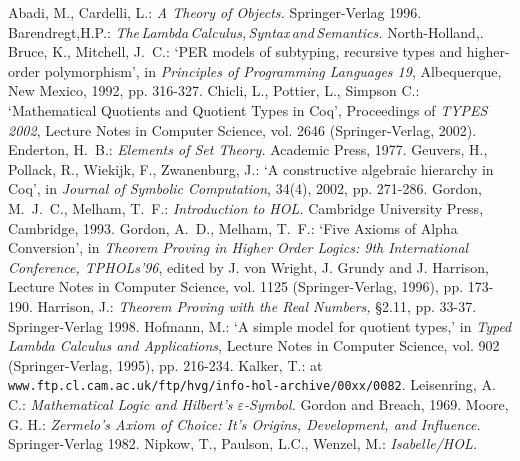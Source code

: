 \documentclass[envcountsame,runningheads]{llncs}
\begin{document}
%
%
\begin{thebibliography}{5}
%
Abadi, M., Cardelli, L.:
{\it A Theory of Objects.}
Springer-Verlag 1996.
%
Barendregt,\:H.P.:
{\it The\,Lambda\,Calculus,\,Syntax\,and\,Semantics.}
North-Holland,.
%
Bruce, K., Mitchell, J.~C.:
`PER models of subtyping, recursive types and higher-order polymorphism', in
{\it Principles of Programming Languages 19},
Albequerque, New Mexico, 1992, pp. 316-327.
%
Chicli, L., Pottier, L., Simpson C.:
`Mathematical Quotients and Quotient Types in Coq',
Proceedings of {\it TYPES 2002},
Lecture Notes in Computer Science, vol. 2646
(Springer-Verlag, 2002).
%
Enderton, H.~B.:
{\it Elements of Set Theory.}
Academic Press, 1977.
%
Geuvers, H., Pollack, R., Wiekijk, F., Zwanenburg, J.:
`A constructive algebraic hierarchy in Coq', in
{\it Journal of Symbolic Computation}, 34(4), 2002, pp. 271-286.
%
Gordon, M.~J.~C., Melham, T.~F.:
{\it Introduction to HOL.}
Cambridge University Press, Cambridge, 1993.
%
Gordon, A.~D., Melham, T.~F.:
`Five Axioms of Alpha Conversion', in
{\it Theorem Proving in Higher Order Logics:
9th International Conference, TPHOLs'96},
edited by J. von Wright, J. Grundy and J. Harrison,
Lecture Notes in Computer Science, vol. 1125
(Springer-Verlag, 1996), pp. 173-190.
%
Harrison, J.:
{\it Theorem Proving with the Real Numbers,}
\S{2.11}, pp. 33-37.
Springer-Verlag 1998.
%
Hofmann, M.:
`A simple model for quotient types,' in
{\it Typed Lambda Calculus and Applications},
Lecture Notes in Computer Science, vol. 902
(Springer-Verlag, 1995), pp. 216-234.
%
%
%
Kalker, T.: at
{\tt www.ftp.cl.cam.ac.uk/ftp/hvg/info-hol-archive/00xx/0082}.
%
Leisenring, A. C.:
{\it Mathematical Logic and Hilbert's $\varepsilon$-Symbol.}
Gordon and Breach, 1969.
%
Moore, G. H.:
{\it Zermelo's Axiom of Choice: It's Origins, Development, and Influence.}
Springer-Verlag 1982.
%
Nipkow, T., Paulson, L.C., Wenzel, M.:
{\it Isabelle/HOL.}

\end{thebibliography}
\end{document}
